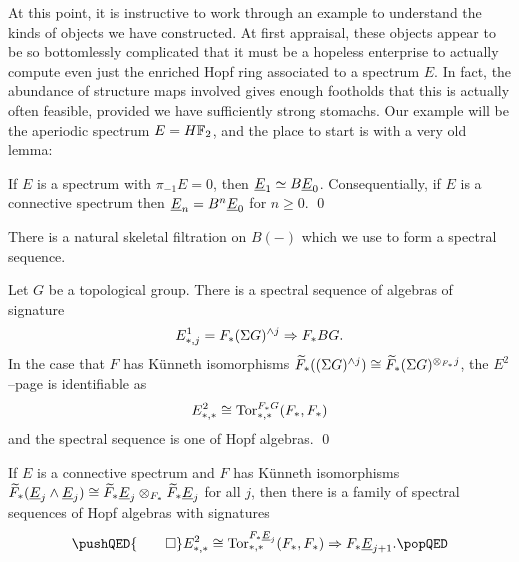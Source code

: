 At this point, it is instructive to work through an example to understand the kinds of objects we have constructed.  At first appraisal, these objects appear to be so bottomlessly complicated that it must be a hopeless enterprise to actually compute even just the enriched Hopf ring associated to a spectrum \(E\).  In fact, the abundance of structure maps involved gives enough footholds that this is actually often feasible, provided we have sufficiently strong stomachs.  Our example will be the aperiodic spectrum \(E = \HFtwo\), and the place to start is with a very old lemma:
\begin{lemma}
If \(E\) is a spectrum with \(\pi_{-1} E = 0\), then \(\underline{\smash{E}}_{1} \simeq B\underline{\smash{E}}_{0}\).  Consequentially, if \(E\) is a connective spectrum then \(\underline{\smash{E}}_{n} = B^n \underline{\smash{E}}_{0}\) for \(n \ge 0\). \qed
\end{lemma}
\noindent There is a natural skeletal filtration on \(B(-)\) which we use to form a spectral sequence.
\begin{lemma}
Let \(G\) be a topological group.  There is a spectral sequence of algebras of signature \[E^1_{*, j} = F_*(\Sigma G)^{\wedge j} \Rightarrow F_* BG.\]  In the case that \(F\) has K\"unneth isomorphisms \(\widetilde F_*((\Sigma G)^{\wedge j}) \cong \widetilde F_*(\Sigma G)^{\otimes_{F_*} j}\), the \(E^2\)--page is identifiable as \[E^2_{*, *} \cong \operatorname{Tor}^{F_* G}_{*, *}(F_*, F_*)\] and the spectral sequence is one of Hopf algebras. \qed
\end{lemma}
\begin{corollary}
If \(E\) is a connective spectrum and \(F\) has K\"unneth isomorphisms \(\widetilde F_*(\underline{\smash{E}}_{j} \wedge \underline{\smash{E}}_{j}) \cong \widetilde F_* \underline{\smash{E}}_{j} \otimes_{F_*} \widetilde F_* \underline{\smash{E}}_{j}\) for all \(j\), then there is a family of spectral sequences of Hopf algebras with signatures
\[
\pushQED{\qed}
E^2_{*, *} \cong \Tor^{F_* \OS{E}{j}}_{*, *}(F_*, F_*) \Rightarrow F_* \OS{E}{j+1}. \qedhere
\popQED
\]
\end{corollary}

